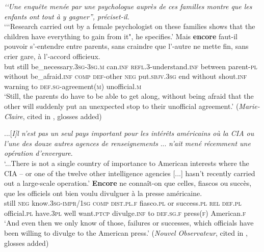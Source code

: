 \begin{exe}	\ex\label{exAppendixFrenchEncoreConcessiveInversion1}
	\begin{xlist}
	\exi{} \textit{\lq\lq Une enquête menée par une psychologue auprès de ces familles montre que les enfants ont tout à y gagner”, préciset-il.}\\
	\lq {\lq\lq}Research carried out by a female psychologist on these families shows that the children have everything to gain from it", he specifies.\rq
	\exi{} \gll Mais \textbf{encore} faut-il pouvoir s'-entendre entre parents, sans craindre que l'-autre ne mette fin, sans crier gare, à l'-accord officieux.\\
	but still be\_necessary.3\textsc{sg}-3\textsc{sg}.\textsc{m} can.\textsc{inf} \textsc{refl}.3-understand.\textsc{inf} between parent-\textsc{pl} without be\_afraid.\textsc{inf} \textsc{comp} \textsc{def}-other \textsc{neg} put.\textsc{sbjv}.3\textsc{sg} end without shout.\textsc{inf} warning to \textsc{def}.\textsc{sg}-agreement(\textsc{m}) unofficial.\textsc{m}\\
	\glt \lq Still, the parents do have to be able to get along, without being afraid that the other will suddenly put an unexpected stop to their unofficial agreement.' (\textit{Marie-Claire}, cited in \cite[193–194]{MosegaardHansen2008}, glosses added)
	\end{xlist}
	
	\ex\label{exAppendixFrenchEncoreConcessiveInversion2}
	\begin{xlist}
	\exi{}...[\textit{I]}\textit{l n’est pas un seul pays important pour les intérêts américains où la CIA \textendash{ }ou l’une des douze autres agences de renseignements} ... \textit{n’ait mené récemment une opération d’envergure}.\\
	\lq ...There is not a single country of importance to American interests where the CIA – or one of the twelve other intelligence agencies [...] hasn’t recently carried out a large-scale operation.'
	\exi{}\gll \textbf{Encore} ne connaît-on que celles, fiascos ou succès, que les officiels ont bien voulu divulguer à la presse américaine.\\
	still \textsc{neg} know.3\textsc{sg}-\textsc{impr}/1\textsc{sg} \textsc{comp} \textsc{dist}.\textsc{pl}.\textsc{f} fiasco.\textsc{pl} or success.\textsc{pl} \textsc{rel} \textsc{def}.\textsc{pl} official.\textsc{pl} have.3\textsc{pl} well want.\textsc{ptcp} divulge.\textsc{inf} to \textsc{def}.\textsc{sg}.\textsc{f} press(\textsc{f}) American.\textsc{f}\\
	\glt \lq And even then we only know of those, failures or successes, which officials have been willing to divulge to the American press.' (\textit{Nouvel Observateur}, cited in \cite[194]{MosegaardHansen2008}, glosses added)
	\end{xlist}
\end{exe}	
	
